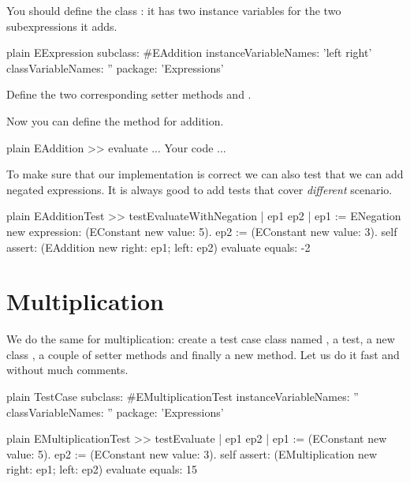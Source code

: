 \documentclass[10pt,twoside,english]{_support/latex/sbabook/sbabook}
\begin{document}
	
You should define the class : it has two instance variables for the two subexpressions it adds. 

\begin{displaycode}{plain}
EExpression subclass: #EAddition
	instanceVariableNames: 'left right'
	classVariableNames: ''
	package: 'Expressions'
\end{displaycode}

Define the two corresponding setter methods  and . 

Now you can define the  method for addition. 

\begin{displaycode}{plain}
EAddition >> evaluate
	... Your code ...
\end{displaycode}

	
To make sure that our implementation is correct we can also test that we can add negated expressions. 
It is always good to add tests that cover \textit{different} scenario. 
	

\begin{displaycode}{plain}
EAdditionTest >> testEvaluateWithNegation
	| ep1 ep2 |
	ep1 := ENegation new expression: (EConstant new value: 5).
	ep2 := (EConstant new value: 3).
	self assert: (EAddition new right: ep1; left: ep2) evaluate equals: -2
\end{displaycode}

	
	
\section{Multiplication}
We do the same for multiplication: create a test case class named , a test, a new class , a couple of setter methods and finally a new  method. Let us do it fast and without much comments. 

\begin{displaycode}{plain}
TestCase subclass: #EMultiplicationTest
	instanceVariableNames: ''
	classVariableNames: ''
	package: 'Expressions'
\end{displaycode}

\begin{displaycode}{plain}
EMultiplicationTest >> testEvaluate
	| ep1 ep2 |
	ep1 := (EConstant new value: 5).
	ep2 := (EConstant new value: 3).
	self assert: (EMultiplication new right: ep1; left: ep2) evaluate equals: 15
\end{displaycode}
\end{document}
